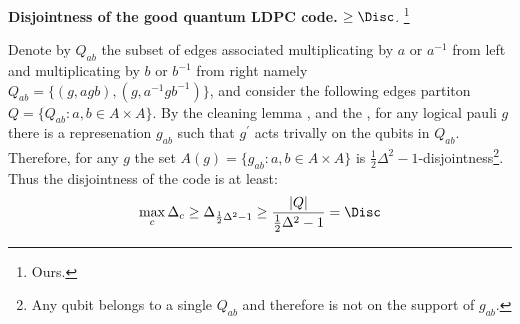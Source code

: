 
  \item \textbf{Disjointness of the good quantum LDPC code.} $ \ge \Disc$. \footnote{Ours.}

  Denote by $Q_{ab}$ the subset of edges associated multiplicating by $a$ or $a^{-1}$ from left and multiplicating by $b$ or $b^{-1}$ from right namely $ Q_{ab} =  \{ (g, agb), (g, a^{-1}gb^{-1}) \} $, and consider the following edges partiton $Q = \{ Q_{ab} : a,b \in A\times A \}$. By the cleaning lemma \cite{Bravyi_2009}\cite{cleaning_lemm_2}, and the , for any logical pauli $g$ there is a represenation $g_{ab}$ such that $g^{\prime}$ acts trivally on the qubits in $Q_{ab}$. Therefore, for any $g$ the set $ A(g) = \{ g_{ab} : a,b \in A \times A \}$  is $ \frac{1}{2}\Delta^{2}-1$-disjointness\footnote{Any qubit belongs to a single $Q_{ab}$ and therefore is not on the support of $g_{ab}$.}. Thus the disjointness of the code is at least: 
  \begin{equation*}
    \begin{split}
      \max_{c} \Delta_{c} \ge \Delta_{\frac{1}{2} \Delta^{2} - 1 } \ge \frac{  |Q|   }{\frac{1}{2} \Delta^{2} - 1  } = \Disc
    \end{split}
  \end{equation*} 
